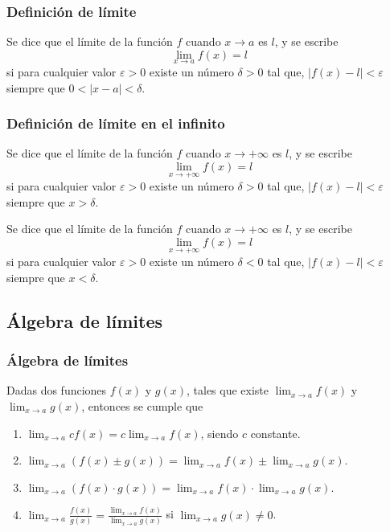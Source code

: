 \begin{frame}
\frametitle{Definición de límite}
\begin{definicion}
Se dice que el límite de la función $f$ cuando $x\rightarrow a$ es $l$, y se escribe
\[\lim_{x\rightarrow a} f(x) =l\]
si para cualquier valor $\varepsilon>0$ existe un número $\delta>0$ tal que, $|f(x)-l|<\varepsilon$ siempre que $0<|x-a|<\delta$.
\end{definicion}

\begin{center}
\scalebox{1}{}
\end{center}
\end{frame}


\begin{frame}
\frametitle{Definición de límite en el infinito}
\begin{definicion}
Se dice que el límite de la función $f$ cuando $x\rightarrow +\infty$ es $l$, y se escribe
\[\lim_{x\rightarrow +\infty} f(x) =l\]
si para cualquier valor $\varepsilon>0$ existe un número $\delta>0$ tal que, $|f(x)-l|<\varepsilon$ siempre que $x>\delta$.

Se dice que el límite de la función $f$ cuando $x\rightarrow +\infty$ es $l$, y se escribe
\[\lim_{x\rightarrow +\infty} f(x) =l\]
si para cualquier valor $\varepsilon>0$ existe un número $\delta<0$ tal que, $|f(x)-l|<\varepsilon$ siempre que $x<\delta$.
\end{definicion}
\end{frame}



\subsection{Álgebra de límites}
\begin{frame}
\frametitle{Álgebra de límites}
Dadas dos funciones $f(x)$ y $g(x)$, tales que existe $\lim_{x\rightarrow a}f(x)$ y $\lim_{x\rightarrow a}g(x)$, entonces se cumple que
\begin{enumerate}
\item $\displaystyle \lim_{x\rightarrow a}c f(x)=c\lim_{x\rightarrow a}f(x)$, siendo $c$ constante. 
\item $\displaystyle \lim_{x\rightarrow a}(f(x)\pm g(x))=\lim_{x\rightarrow a}f(x)\pm \lim_{x\rightarrow a}g(x)$.
\item $\displaystyle \lim_{x\rightarrow a}(f(x)\cdot g(x))=\lim_{x\rightarrow a}f(x)\cdot \lim_{x\rightarrow a}g(x)$.
\item $\displaystyle \lim_{x\rightarrow a}\frac{f(x)}{g(x)}=\frac{\displaystyle \lim_{x\rightarrow
a}f(x)}{\displaystyle \lim_{x\rightarrow a}g(x)}$ si $\displaystyle \lim_{x\rightarrow a}g(x)\neq 0$.
\end{enumerate}
\end{frame}

